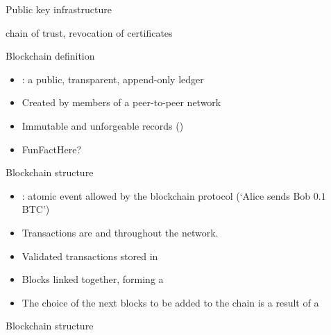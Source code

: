 \begin{frame}{Public key infrastructure}

chain of trust, revocation of certificates

\end{frame}

\begin{frame}{Blockchain definition}

\begin{itemize}
\item {}: a public, transparent,
append-only ledger
\item Created by members of a peer-to-peer
network
\item Immutable and unforgeable records ()
\item FunFactHere?
\end{itemize}

\end{frame}



\begin{frame}{Blockchain structure}

\begin{itemize}
\item {}: atomic event
allowed by the blockchain protocol (`Alice sends Bob $0.1$ BTC')
\item Transactions are  and 
throughout the network.
\item Validated transactions
stored in 
\item Blocks linked together,
forming a 
\item The choice of the next blocks to be
added to the chain is a result of a 
\end{itemize}

\end{frame}

\begin{frame}{Blockchain structure}

\begin{center}
\end{center}

\end{frame}


